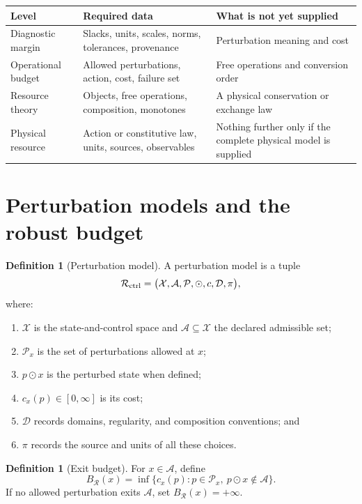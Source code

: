 \documentclass[11pt]{article}
\theoremstyle{definition}
\newtheorem{definition}[theorem]{Definition}
\theoremstyle{remark}
\newcommand{\cA}{\mathcal A}
\newcommand{\cD}{\mathcal D}
\newcommand{\cP}{\mathcal P}
\newcommand{\cR}{\mathcal R}
\newcommand{\cX}{\mathcal X}
\begin{document}
\begin{center}
\begin{tabularx}{\textwidth}{@{}L{0.23\textwidth}Y Y@{}}
\toprule
Level & Required data & What is not yet supplied \\
\midrule
Diagnostic margin
& Slacks, units, scales, norms, tolerances, provenance
& Perturbation meaning and cost\\

Operational budget
& Allowed perturbations, action, cost, failure set
& Free operations and conversion order\\

Resource theory
& Objects, free operations, composition, monotones
& A physical conservation or exchange law\\

Physical resource
& Action or constitutive law, units, sources, observables
& Nothing further only if the complete physical model is supplied\\
\bottomrule
\end{tabularx}
\end{center}

\section{Perturbation models and the robust budget}
\label{sec:budget}

\begin{definition}[Perturbation model]
\label{def:perturbation}
A perturbation model is a tuple
\[
 \cR_{\rm ctrl}
 =
 \bigl(
 \cX,\cA,\cP,\odot,c,\cD,\pi
 \bigr),
\]
where:
\begin{enumerate}[leftmargin=2.2em]
\item \(\cX\) is the state-and-control space and
      \(\cA\subseteq\cX\) the declared admissible set;
\item \(\cP_x\) is the set of perturbations allowed at \(x\);
\item \(p\odot x\) is the perturbed state when defined;
\item \(c_x(p)\in[0,\infty]\) is its cost;
\item \(\cD\) records domains, regularity, and composition conventions; and
\item \(\pi\) records the source and units of all these choices.
\end{enumerate}
\end{definition}

\begin{definition}[Exit budget]
\label{def:exitbudget}
For \(x\in\cA\), define
\[
 B_{\cR}(x)
 =
 \inf\bigl\{
 c_x(p):p\in\cP_x,\ p\odot x\notin\cA
 \bigr\}.
\]
If no allowed perturbation exits \(\cA\), set \(B_{\cR}(x)=+\infty\).
\end{definition}
\end{document}
